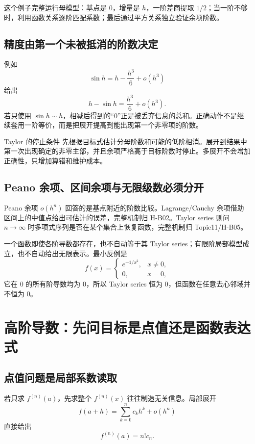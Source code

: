 \documentclass[11pt,a4paper]{ctexart}
\begin{document}
这个例子完整运行母模型：基点是 $0$，增量是 $h$，一阶差商提取 $1/2$；当一阶不够时，利用函数关系逐阶匹配系数；最后通过平方关系独立验证余项阶数。

\subsection{精度由第一个未被抵消的阶数决定}

例如
\[
\sin h=h-\frac{h^3}{6}+o(h^3)
\]
给出
\[
h-\sin h=\frac{h^3}{6}+o(h^3).
\]
若只使用 $\sin h\sim h$，相减后得到的“$0$”正是被丢弃信息的总和。正确动作不是继续套用一阶等价，而是把展开提高到能出现第一个非零项的阶数。

\begin{corebox}{Taylor 的停止条件}
先根据目标式估计分母阶数和可能的低阶相消。展开到结果中第一次出现确定的非零主部，并且余项严格高于目标阶数时停止。多展开不会增加正确性，只增加算错和维护成本。
\end{corebox}

\subsection{Peano 余项、区间余项与无限级数必须分开}

Peano 余项 $o(h^n)$ 回答的是基点附近的阶数比较。Lagrange/Cauchy 余项借助区间上的中值点给出可估计的误差，完整机制归 H-B02。Taylor series 则问 $n\to\infty$ 时多项式序列是否在某个集合上恢复函数，完整机制归 Topic11/H-B05。

一个函数即使各阶导数都存在，也不自动等于其 Taylor series；有限阶局部模型成立，也不自动给出无限表示。最小反例是
\[
f(x)=
\begin{cases}
e^{-1/x^2},&x\ne0,\\
0,&x=0,
\end{cases}
\]
它在 $0$ 的所有阶导数均为 $0$，所以 Taylor series 恒为 $0$，但函数在任意去心邻域并不恒为 $0$。

\section{高阶导数：先问目标是点值还是函数表达式}

\subsection{点值问题是局部系数读取}

若只求 $f^{(n)}(a)$，先求整个 $f^{(n)}(x)$ 往往制造无关信息。局部展开
\[
f(a+h)=\sum_{k=0}^{n}c_k h^k+o(h^n)
\]
直接给出
\[
f^{(n)}(a)=n!c_n.
\]
\end{document}
